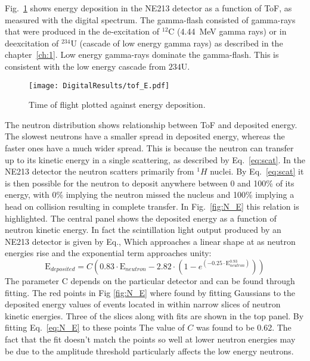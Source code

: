 \documentclass[main.tex]{subfiles}
\begin{document}
Fig.~\ref{fig:tof_E_d} shows energy deposition in the NE213 detector as a function of ToF, as measured with the digital spectrum. The gamma-flash consisted of gamma-rays that were produced in the de-excitation of $^\mathrm{12}$C (\SI{4.44}{MeV} gamma rays) or in deexcitation of $^\mathrm{234}$U (cascade of low energy gamma rays) as described in the chapter~\ref{ch:1}. Low energy gamma-rays dominate the gamma-flash. This is consistent with the low energy cascade from $\mathrm{234}$U.

\begin{figure}[ht]
    \centering
        \texttt{[image: DigitalResults/tof\_E.pdf]}
        \caption[Time of flight plotted against energy deposition.]{Time of flight plotted against energy deposition.}
    \label{fig:tof_E_d} 
\end{figure}

The neutron distribution shows relationship between ToF and deposited energy. The slowest neutrons have a smaller spread in deposited energy, whereas the faster ones have a much wider spread. This is because the neutron can transfer up to its kinetic energy in a single scattering, as described by Eq.~\ref{eq:scat}. In the NE213 detector the neutron scatters primarily from $^1H$ nuclei. By Eq.~\ref{eq:scat} it is then possible for the neutron to deposit anywhere between 0 and 100\% of its energy, with 0\% implying the neutron missed the nucleus and 100\% implying a head on collision resulting in complete transfer. 
In Fig.~\ref{fig:N_E} this relation is highlighted. 
The central panel shows the deposited energy as a function of neutron kinetic energy. In fact the scintillation light output produced by an NE213 detector is given by Eq.\cite{Scherzinger:2016}, Which approaches a linear shape at as neutron energies rise and the exponential term approaches unity:
\begin{equation}
	\textrm{E}_{deposited} = C\left(  0.83\cdot \textrm{E}_{neutron} - 2.82\cdot\left(  1 - e^{(-0.25\cdot \textrm{E}_{neutron}^{0.93})}  \right)  \right)
	\label{eq:N_E}
\end{equation}
The parameter C depends on the particular detector and can be found through fitting. The red points in Fig \ref{fig:N_E} where found by fitting Gaussians to the deposited energy values of events located in within narrow slices of neutron kinetic energies. Three of the slices along with fits are shown in the top panel. By fitting Eq.~\ref{eq:N_E} to these points The value of $C$ was found to be 0.62. The fact that the fit doesn't match the points so well at lower neutron energies may be due to the amplitude threshold particularly affects the low energy neutrons.
\end{document}
